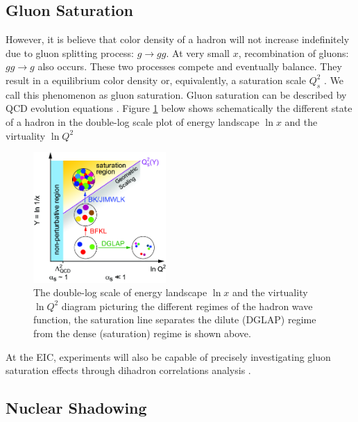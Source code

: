 \subsection{Gluon Saturation}

However, it is believe that color density of a hadron will not increase indefinitely due to gluon splitting process: $g \rightarrow gg$. At very small $x$, recombination of gluons: $gg \rightarrow g$ also occurs. These two processes compete and eventually balance. They result in a equilibrium color density or, equivalently, a saturation scale $Q_s^2$ \cite{GSIntro}. We call this phenomenon as gluon saturation. Gluon saturation can be described by QCD evolution equations \cite{DGLAP1,DGLAP2,DGLAP3,BFKL,JIMWLKBK}. Figure \ref{GSScalePlot} below shows schematically the different state of a hadron in the double-log scale plot of energy landscape $\ln x$ and the virtuality $\ln Q^2$ \cite{GluonSatuPlot}

\begin{figure}[hbtp]
\begin{center}
\includegraphics[width=0.45\textwidth]{Figures/Chapter1/GSScalePlot.png}
\caption{The double-log scale of energy landscape $\ln x$ and the virtuality $\ln Q^2$ diagram picturing the different regimes of the hadron wave function, the saturation line separates the dilute (DGLAP) regime from the dense (saturation) regime is shown above.}
\label{GSScalePlot}
\end{center}
\end{figure} 

At the EIC, experiments will also be capable of precisely investigating gluon saturation effects through dihadron correlations analysis \cite{EICGSDIH}.


\subsection{Nuclear Shadowing}

